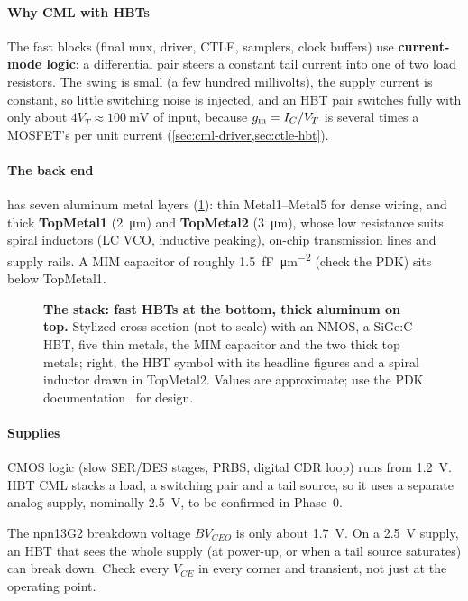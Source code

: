 \paragraph{Why CML with HBTs} The fast blocks (final mux, driver, CTLE, samplers, clock buffers) use \textbf{current-mode logic}: a differential pair steers a constant tail current into one of two load resistors. The swing is small (a few hundred millivolts), the supply current is constant, so little switching noise is injected, and an HBT pair switches fully with only about $4V_T \approx \qty{100}{\milli\volt}$ of input, because $g_\mathrm{m} = I_C/V_T$ is several times a MOSFET's per unit current (\cref{sec:cml-driver,sec:ctle-hbt}).

\paragraph{The back end} \sgx{} has seven aluminum metal layers (\cref{fig:ch1-beol}): thin Metal1--Metal5 for dense wiring, and thick \textbf{TopMetal1} (\qty{2}{\micro\meter}) and \textbf{TopMetal2} (\qty{3}{\micro\meter}), whose low resistance suits spiral inductors (LC VCO, inductive peaking), on-chip transmission lines and supply rails. A MIM capacitor of roughly \qty{1.5}{\femto\farad\per\square\micro\meter} (check the PDK) sits below TopMetal1.

\begin{figure}[htbp]
\centering

\caption{\textbf{The \sgx{} stack: fast HBTs at the bottom, thick aluminum on top.} Stylized cross-section (not to scale) with an NMOS, a SiGe:C HBT, five thin metals, the MIM capacitor and the two thick top metals; right, the HBT symbol with its headline figures and a spiral inductor drawn in TopMetal2. Values are approximate; use the PDK documentation~\cite{ihppdk} for design.}
\label{fig:ch1-beol}
\end{figure}

\paragraph{Supplies} CMOS logic (slow SER/DES stages, PRBS, digital CDR loop) runs from \qty{1.2}{\volt}. HBT CML stacks a load, a switching pair and a tail source, so it uses a separate analog supply, nominally \qty{2.5}{\volt}, to be confirmed in Phase~0.

\begin{pitfall}
The npn13G2 breakdown voltage $BV_{CEO}$ is only about \qty{1.7}{\volt}. On a \qty{2.5}{\volt} supply, an HBT that sees the whole supply (at power-up, or when a tail source saturates) can break down. Check every $V_{CE}$ in every corner and transient, not just at the operating point.
\end{pitfall}

